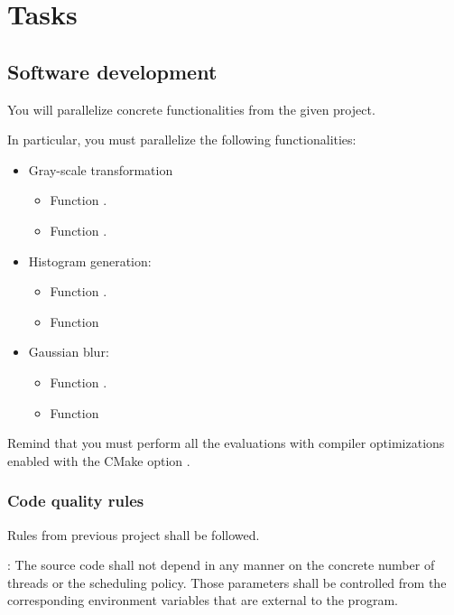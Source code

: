 \section{Tasks}

\subsection{Software development}

You will parallelize concrete functionalities from the given project.

In particular, you must parallelize the following functionalities:

\begin{itemize}
  \item Gray-scale transformation
    \begin{itemize}
      \item Function .
      \item Function .
    \end{itemize}

  \item Histogram generation:
    \begin{itemize}
      \item Function .
      \item Function 
    \end{itemize}

  \item Gaussian blur:
    \begin{itemize}
      \item Function .
      \item Function 
    \end{itemize}
\end{itemize}

Remind that you must perform all the evaluations with compiler optimizations
enabled with the CMake option
.

\subsubsection{Code quality rules}

Rules from previous project shall be followed.

: 
The source code shall not depend in any manner on the concrete number of threads or
the scheduling policy. Those parameters shall be controlled from the corresponding
environment variables that are external to the program.

